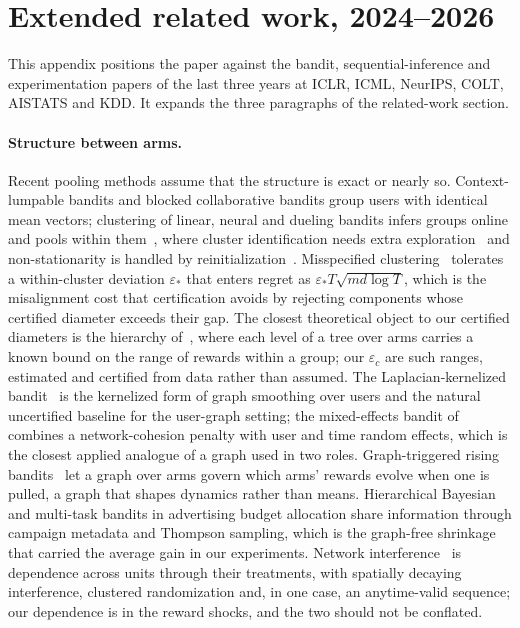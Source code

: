 \documentclass[sigconf,review,anonymous]{acmart}
\begin{document}
\section{Extended related work, 2024--2026}\label{app:related}

This appendix positions the paper against the bandit, sequential-inference and experimentation papers of the last three years at ICLR, ICML, NeurIPS, COLT, AISTATS and KDD. It expands the three paragraphs of the related-work section.

\paragraph{Structure between arms.} Recent pooling methods assume that the structure is exact or nearly so. Context-lumpable bandits and blocked collaborative bandits group users with identical mean vectors; clustering of linear, neural and dueling bandits infers groups online and pools within them~\cite{li2025demystifying,ban2024meta,su2025sere}, where cluster identification needs extra exploration~\cite{li2025demystifying} and non-stationarity is handled by reinitialization~\cite{su2025sere}. Misspecified clustering~\cite{wang2023misspecified} tolerates a within-cluster deviation $\varepsilon_*$ that enters regret as $\varepsilon_*T\sqrt{md\log T}$, which is the misalignment cost that certification avoids by rejecting components whose certified diameter exceeds their gap. The closest theoretical object to our certified diameters is the hierarchy of~\cite{eldowa2026similarities}, where each level of a tree over arms carries a known bound on the range of rewards within a group; our $\varepsilon_c$ are such ranges, estimated and certified from data rather than assumed. The Laplacian-kernelized bandit~\cite{wu2026laplacian} is the kernelized form of graph smoothing over users and the natural uncertified baseline for the user-graph setting; the mixed-effects bandit of~\cite{huch2024rome} combines a network-cohesion penalty with user and time random effects, which is the closest applied analogue of a graph used in two roles. Graph-triggered rising bandits~\cite{genalti2024graphtriggered} let a graph over arms govern which arms' rewards evolve when one is pulled, a graph that shapes dynamics rather than means. Hierarchical Bayesian and multi-task bandits in advertising budget allocation share information through campaign metadata and Thompson sampling, which is the graph-free shrinkage that carried the average gain in our experiments. Network interference~\cite{agarwal2024interference,jia2025interference,wang2025designbased} is dependence across units through their treatments, with spatially decaying interference, clustered randomization and, in one case, an anytime-valid sequence; our dependence is in the reward shocks, and the two should not be conflated.
\end{document}
